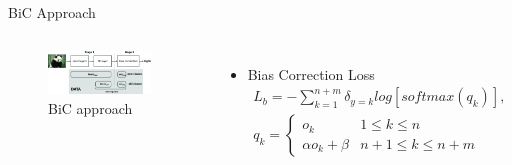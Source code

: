 \documentclass[aspectratio=169, xcolor=dvipsnames]{beamer}
\begin{document}
\begin{frame}{BiC Approach}
\begin{columns}
      \begin{figure}[ht!]
            \centering
            \includegraphics[width=0.9\textwidth]{images/bic_method}
            \caption{BiC approach\footnotemark[14]}
      \end{figure}
      \vspace{-0.5cm}
      \begin{itemize}
      \item Bias Correction Loss\\
      \vspace{-0.5cm}
            {\small
            \begin{equation}
            \begin{split}
            L_b = - \sum^{n+m}_{k=1} \delta_{y=k} log[softmax(q_k)],\\
            q_k =
            \begin{cases} 
            o_k & 1 \leq k \leq n \\
            \alpha o_k + \beta & n+1 \leq k \leq n+m 
            \end{cases}
            \end{split}
            \end{equation}
            }
      \end{itemize}
      \end{columns}
\end{frame}
\end{document}
